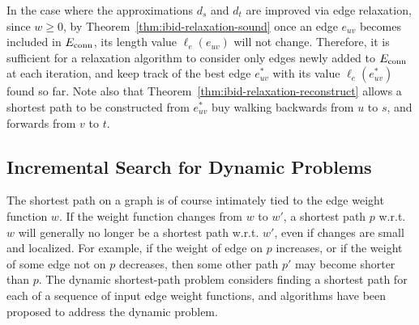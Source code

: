 In the case where the approximations $d_s$ and $d_t$ are improved
via edge relaxation,
since $w \geq 0$,
by Theorem~\ref{thm:ibid-relaxation-sound}
once an edge $e_{uv}$ becomes included in
$E_{\mbox{\scriptsize conn}}$,
its length value $\ell_e(e_{uv})$ will not change.
Therefore,
it is sufficient for a relaxation algorithm to consider only edges
newly added to $E_{\mbox{\scriptsize conn}}$ at each iteration,
and keep track of the best edge $e^*_{uv}$
with its value $\ell_e(e^*_{uv})$ found so far.
Note also that Theorem~\ref{thm:ibid-relaxation-reconstruct}
allows a shortest path to be constructed from $e^*_{uv}$
buy walking backwards from $u$ to $s$,
and forwards from $v$ to $t$.


\subsection{Incremental Search for Dynamic Problems}
\label{sec:ibid:incremental}

The shortest path on a graph is of course intimately tied to
the edge weight function $w$.
If the weight function changes from $w$ to $w'$,
a shortest path $p$ w.r.t. $w$
will generally no longer be a shortest path w.r.t. $w'$,
even if changes are small and localized.
For example,
if the weight of edge on $p$ increases,
or if the weight of some edge not on $p$ decreases,
then some other path $p'$ may become shorter than $p$.
The dynamic shortest-path problem considers finding a shortest path
for each of a sequence of input edge weight functions,
and algorithms have been proposed to address the dynamic problem.


